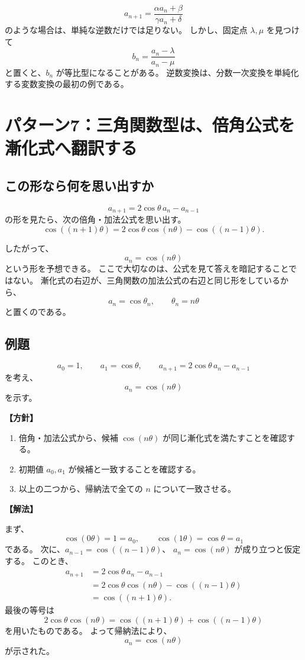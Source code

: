 \[
  a_{n+1}=\frac{\alpha a_n+\beta}{\gamma a_n+\delta}
\]
のような場合は、単純な逆数だけでは足りない。
しかし、固定点 $\lambda,\mu$ を見つけて
\[
  b_n=\frac{a_n-\lambda}{a_n-\mu}
\]
と置くと、$b_n$ が等比型になることがある。
逆数変換は、分数一次変換を単純化する変数変換の最初の例である。

\section{パターン7：三角関数型は、倍角公式を漸化式へ翻訳する}

\subsection{この形なら何を思い出すか}

\[
  a_{n+1}=2\cos\theta\,a_n-a_{n-1}
\]
の形を見たら、次の倍角・加法公式を思い出す。
\[
  \cos((n+1)\theta)
  =2\cos\theta\cos(n\theta)-\cos((n-1)\theta).
\]

したがって、
\[
  a_n=\cos(n\theta)
\]
という形を予想できる。
ここで大切なのは、公式を見て答えを暗記することではない。
漸化式の右辺が、三角関数の加法公式の右辺と同じ形をしているから、
\[
  a_n=\cos\theta_n,\qquad \theta_n=n\theta
\]
と置くのである。

\subsection{例題}

\[
  a_0=1,\qquad a_1=\cos\theta,\qquad
  a_{n+1}=2\cos\theta\,a_n-a_{n-1}
\]
を考え、
\[
  a_n=\cos(n\theta)
\]
を示す。

\noindent\textbf{【方針】}

\begin{enumerate}
  \item 倍角・加法公式から、候補 $\cos(n\theta)$ が同じ漸化式を満たすことを確認する。
  \item 初期値 $a_0,a_1$ が候補と一致することを確認する。
  \item 以上の二つから、帰納法で全ての $n$ について一致させる。
\end{enumerate}

\noindent\textbf{【解法】}

まず、
\[
  \cos(0\theta)=1=a_0,\qquad
  \cos(1\theta)=\cos\theta=a_1
\]
である。
次に、$a_{n-1}=\cos((n-1)\theta)$、
$a_n=\cos(n\theta)$ が成り立つと仮定する。
このとき、
\[
  \begin{aligned}
    a_{n+1}
     & =2\cos\theta\,a_n-a_{n-1} \\
     & =2\cos\theta\cos(n\theta)
    -\cos((n-1)\theta)           \\
     & =\cos((n+1)\theta).
  \end{aligned}
\]
最後の等号は
\[
  2\cos\theta\cos(n\theta)
  =\cos((n+1)\theta)+\cos((n-1)\theta)
\]
を用いたものである。
よって帰納法により、
\[
  \boxed{a_n=\cos(n\theta)}
\]
が示された。

